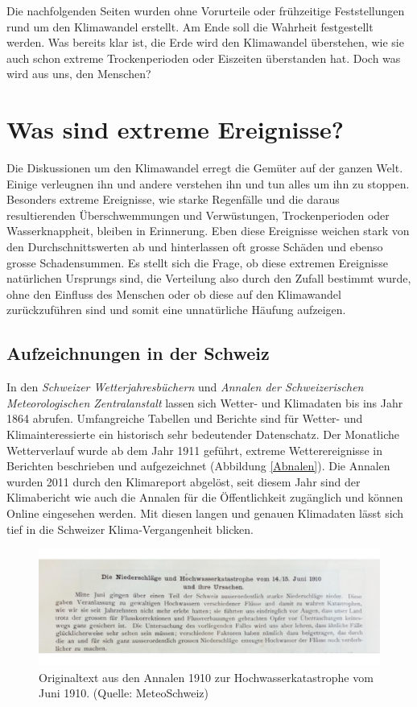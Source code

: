 \begin{refsection}
Die nachfolgenden Seiten wurden ohne Vorurteile oder frühzeitige Feststellungen rund um den Klimawandel erstellt. Am Ende soll die Wahrheit festgestellt werden.
Was bereits klar ist, die Erde wird den Klimawandel überstehen, wie sie auch schon extreme Trockenperioden oder Eiszeiten überstanden hat. Doch was wird aus uns, den Menschen?


\section{Was sind extreme Ereignisse?}
Die Diskussionen um den Klimawandel erregt die Gemüter auf der ganzen Welt. Einige verleugnen ihn und andere verstehen ihn und tun alles um ihn zu stoppen. Besonders extreme Ereignisse, wie starke Regenfälle und die daraus resultierenden Überschwemmungen und Verwüstungen, Trockenperioden oder Wasserknappheit, bleiben in Erinnerung.
Eben diese Ereignisse weichen stark von den Durchschnittswerten ab und hinterlassen oft grosse Schäden und ebenso grosse Schadensummen.
Es stellt sich die Frage, ob diese extremen Ereignisse natürlichen Ursprungs sind, die Verteilung also durch den Zufall bestimmt wurde, ohne den Einfluss des Menschen oder ob diese auf den Klimawandel zurückzuführen sind und somit eine unnatürliche Häufung aufzeigen.


\subsection{Aufzeichnungen in der Schweiz}
In den \textit{Schweizer Wetterjahresbüchern} und \textit{Annalen der Schweizerischen Meteorologischen Zentralanstalt} lassen sich Wetter- und Klimadaten bis ins Jahr 1864 abrufen. Umfangreiche Tabellen und Berichte sind für Wetter- und Klimainteressierte ein historisch sehr bedeutender Datenschatz. 
Der Monatliche Wetterverlauf wurde ab dem Jahr 1911 geführt, extreme Wetterereignisse in Berichten beschrieben und aufgezeichnet (Abbildung \ref{Abnalen}). Die Annalen wurden 2011 durch den Klimareport abgelöst, seit diesem Jahr sind der Klimabericht wie auch die Annalen für die Öffentlichkeit zugänglich und können Online eingesehen werden.
Mit diesen langen und genauen Klimadaten lässt sich tief in die Schweizer Klima-Vergangenheit blicken.

\begin{figure}
\centering
\includegraphics[width=\hsize]{extrem/Annalen.jpg}
\caption{Originaltext aus den Annalen 1910 zur Hochwasserkatastrophe vom Juni 1910. (Quelle: MeteoSchweiz)}
\label{Annalen}
\end{figure}



\end{refsection}
